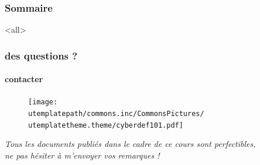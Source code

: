 \begin{frame}
 \frametitle{Sommaire}
      \begin{multicols}{2}
         \tableofcontents[hideallsubsections]
     \end{multicols}
 \end{frame}

\mode<all>{\ubody}

\begin{frame}
 \frametitle{des questions ?}
  \framesubtitle{contacter \umaila}
  					\begin{figure}
  					 \centering
   						 \texttt{[image: \\utemplatepath/commons.inc/CommonsPictures/\\utemplatetheme.theme/cyberdef101.pdf]}\\
				  \end{figure}
				 	 \centering \textit{Tous les documents publiés dans le cadre de ce cours sont perfectibles, \\ne pas hésiter à m'envoyer vos remarques !}
 \end{frame}

